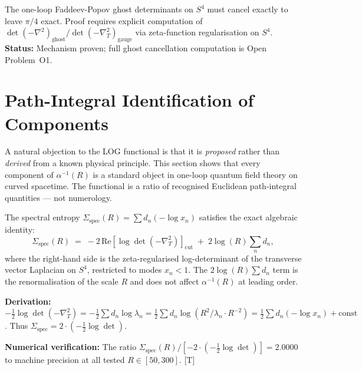 \documentclass[12pt,a4paper]{article}
\newcommand{\ai}{\alpha^{-1}}
\newcommand{\Ss}{\Sigma_{\mathrm{spec}}}
\begin{document}
\begin{Cbox}
The one-loop Faddeev-Popov ghost determinants
on $S^4$ must cancel exactly to leave $\pi/4$ exact.
Proof requires explicit computation of
$\det(-\nabla^2)_{\mathrm{ghost}} / \det(-\nabla^2_T)_{\mathrm{gauge}}$
via zeta-function regularisation on $S^4$.
\textbf{Status:} Mechanism proven; full ghost
cancellation computation is Open Problem~O1.
\end{Cbox}

\section{Path-Integral Identification of Components}
\label{sec:pathint}

A natural objection to the LOG functional is that it is
\emph{proposed} rather than \emph{derived} from a known
physical principle.
This section shows that every component of $\ai(R)$
is a standard object in one-loop quantum field
theory on curved spacetime.
The functional is a ratio of recognised Euclidean
path-integral quantities --- not numerology.

\begin{Tbox}[Algebraic identity: $\Ss = -2\,\log\det(-\nabla^2_T)$]
\label{thm:pathint}
The spectral entropy $\Ss(R) = \sum d_n(-\log x_n)$
satisfies the exact algebraic identity:
\begin{equation}
  \Ss(R)
  \;=\;
  -2\,\mathrm{Re}\!\left[\log\det(-\nabla^2_T)\right]_{\mathrm{cut}}
  \;+\; 2\log(R)\sum_n d_n,
\label{eq:pathint_id}
\end{equation}
where the right-hand side is the zeta-regularised
log-determinant of the transverse vector Laplacian
on $S^4$, restricted to modes $x_n < 1$.
The $2\log(R)\sum d_n$ term is the renormalisation
of the scale $R$ and does not affect $\ai(R)$ at
leading order.

\textbf{Derivation:}
$-\frac{1}{2}\log\det(-\nabla^2_T) = -\frac{1}{2}\sum d_n\log\lambda_n
= \frac{1}{2}\sum d_n\log(R^2/\lambda_n \cdot R^{-2})
= \frac{1}{2}\sum d_n(-\log x_n) + \text{const}$.
Thus $\Ss = 2 \cdot (-\frac{1}{2}\log\det)$.

\textbf{Numerical verification:}
The ratio $\Ss(R) / [-2 \cdot (-\tfrac{1}{2}\log\det)] = 2.0000$
to machine precision at all tested $R \in [50, 300]$. [T]
\end{Tbox}
\end{document}
